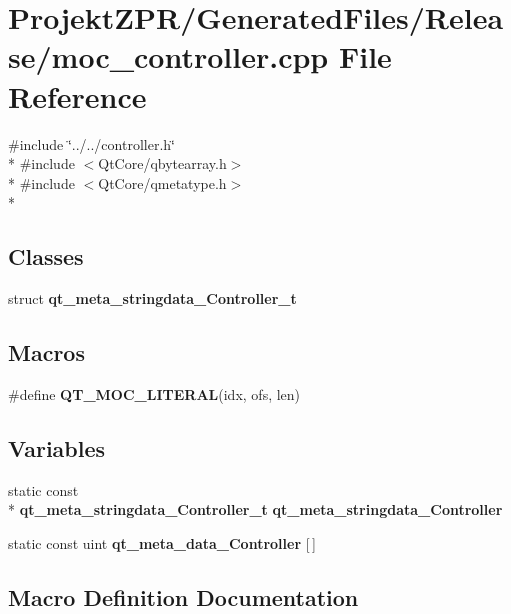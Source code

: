 \section{Projekt\-Z\-P\-R/\-Generated\-Files/\-Release/moc\-\_\-controller.cpp File Reference}
\label{_release_2moc__controller_8cpp}
{\ttfamily \#include \char`\"{}../../controller.\-h\char`\"{}}\\*
{\ttfamily \#include $<$Qt\-Core/qbytearray.\-h$>$}\\*
{\ttfamily \#include $<$Qt\-Core/qmetatype.\-h$>$}\\*
\subsection*{Classes}
\begin{DoxyCompactItemize}
\item 
struct {\bf qt\-\_\-meta\-\_\-stringdata\-\_\-\-Controller\-\_\-t}
\end{DoxyCompactItemize}
\subsection*{Macros}
\begin{DoxyCompactItemize}
\item 
\#define {\bf Q\-T\-\_\-\-M\-O\-C\-\_\-\-L\-I\-T\-E\-R\-A\-L}(idx, ofs, len)
\end{DoxyCompactItemize}
\subsection*{Variables}
\begin{DoxyCompactItemize}
\item 
static const \\*
{\bf qt\-\_\-meta\-\_\-stringdata\-\_\-\-Controller\-\_\-t} {\bf qt\-\_\-meta\-\_\-stringdata\-\_\-\-Controller}
\item 
static const uint {\bf qt\-\_\-meta\-\_\-data\-\_\-\-Controller} [$\,$]
\end{DoxyCompactItemize}


\subsection{Macro Definition Documentation}
